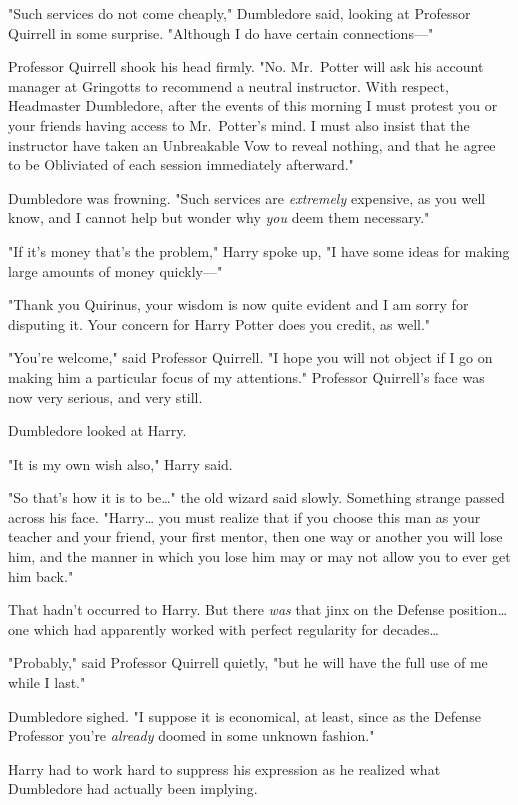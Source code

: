 "Such services do not come cheaply," Dumbledore said, looking at Professor Quirrell in some surprise. "Although I do have certain connections---"

Professor Quirrell shook his head firmly. "No. Mr.~Potter will ask his account manager at Gringotts to recommend a neutral instructor. With respect, Headmaster Dumbledore, after the events of this morning I must protest you or your friends having access to Mr.~Potter's mind. I must also insist that the instructor have taken an Unbreakable Vow to reveal nothing, and that he agree to be Obliviated of each session immediately afterward."

Dumbledore was frowning. "Such services are \emph{extremely} expensive, as you well know, and I cannot help but wonder why \emph{you} deem them necessary."

"If it's money that's the problem," Harry spoke up, "I have some ideas for making large amounts of money quickly---"

"Thank you Quirinus, your wisdom is now quite evident and I am sorry for disputing it. Your concern for Harry Potter does you credit, as well."

"You're welcome," said Professor Quirrell. "I hope you will not object if I go on making him a particular focus of my attentions." Professor Quirrell's face was now very serious, and very still.

Dumbledore looked at Harry.

"It is my own wish also," Harry said.

"So that's how it is to be{\ldots}" the old wizard said slowly. Something strange passed across his face. "Harry{\ldots} you must realize that if you choose this man as your teacher and your friend, your first mentor, then one way or another you will lose him, and the manner in which you lose him may or may not allow you to ever get him back."

That hadn't occurred to Harry. But there \emph{was} that jinx on the Defense position{\ldots} one which had apparently worked with perfect regularity for decades{\ldots}

"Probably," said Professor Quirrell quietly, "but he will have the full use of me while I last."

Dumbledore sighed. "I suppose it is economical, at least, since as the Defense Professor you're \emph{already} doomed in some unknown fashion."

Harry had to work hard to suppress his expression as he realized what Dumbledore had actually been implying.

